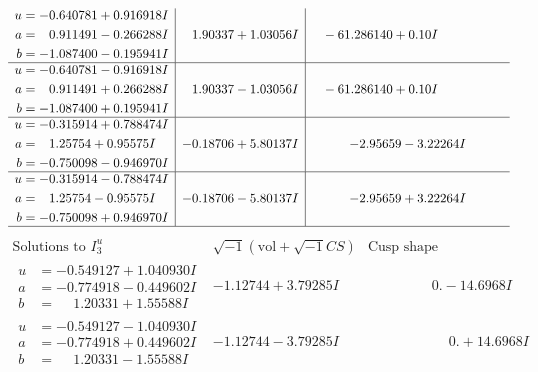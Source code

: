 \documentclass[1p]{elsarticle_modified}
\theoremstyle{definition}
\newcommand{\I}{\sqrt{-1}}
\begin{document}
$$\begin{array}{c|c|c}
\begin{aligned}
u &= -0.640781 + 0.916918 I \\
a &= \phantom{-}0.911491 - 0.266288 I \\
b &= -1.087400 - 0.195941 I\end{aligned}
 & \phantom{-}1.90337 + 1.03056 I & \phantom{-}                -6
1.286140 + 0. 10   I\phantom{ +0.000000I} \\ \hline\begin{aligned}
u &= -0.640781 - 0.916918 I \\
a &= \phantom{-}0.911491 + 0.266288 I \\
b &= -1.087400 + 0.195941 I\end{aligned}
 & \phantom{-}1.90337 - 1.03056 I & \phantom{-}                -6
1.286140 + 0. 10   I\phantom{ +0.000000I} \\ \hline\begin{aligned}
u &= -0.315914 + 0.788474 I \\
a &= \phantom{-}1.25754 + 0.95575 I \\
b &= -0.750098 - 0.946970 I\end{aligned}
 & -0.18706 + 5.80137 I & -2.95659 - 3.22264 I \\ \hline\begin{aligned}
u &= -0.315914 - 0.788474 I \\
a &= \phantom{-}1.25754 - 0.95575 I \\
b &= -0.750098 + 0.946970 I\end{aligned}
 & -0.18706 - 5.80137 I & -2.95659 + 3.22264 I\\
 \hline 
 \end{array}$$\newpage$$\begin{array}{c|c|c}  
\text{Solutions to }I^u_{3}& \I (\text{vol} + \sqrt{-1}CS) & \text{Cusp shape}\\
 \hline 
\begin{aligned}
u &= -0.549127 + 1.040930 I \\
a &= -0.774918 - 0.449602 I \\
b &= \phantom{-}1.20331 + 1.55588 I\end{aligned}
 & -1.12744 + 3.79285 I & \phantom{-0.000000 } 0. - 14.6968 I \\ \hline\begin{aligned}
u &= -0.549127 - 1.040930 I \\
a &= -0.774918 + 0.449602 I \\
b &= \phantom{-}1.20331 - 1.55588 I\end{aligned}
 & -1.12744 - 3.79285 I & \phantom{-0.000000 -}0. + 14.6968 I \\ \hline\begin{aligned}

\end{aligned}
\end{array}$$
\end{document}
